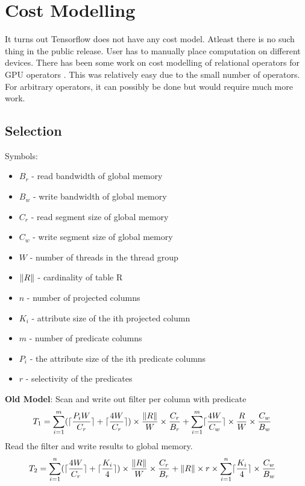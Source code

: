 \section{Cost Modelling}

It turns out Tensorflow does not have any cost model. Atleast there is no such
thing in the public release. User has to manually place computation on different
devices. There has been some work on cost modelling of relational operators for
GPU operators \cite{gpudb}. This was relatively easy due to the small number of
operators. For arbitrary operators, it can possibly be done but would require
much more work.

\subsection{Selection}

Symbols:

\begin{itemize}[label={},noitemsep]
\item $B_r$ - read bandwidth of global memory
\item $B_w$ - write bandwidth of global memory
\item $C_r$ - read segment size of global memory
\item $C_w$ - write segment size of global memory
\item $W$ - number of threads in the thread group
\item $\left\lVert R\right\rVert$ - cardinality of table R
\item $n$ - number of projected columns
\item $K_i$ - attribute size of the ith projected column
\item $m$ - number of predicate columns
\item $P_i$ - the attribute size of the ith predicate columns
\item $r$ - selectivity of the predicates
\end{itemize}

\noindent \textbf{Old Model}: Scan and write out filter per column with predicate
\begin{align*}
T_1 &= \sum_{i=1}^{m} ( \lceil\frac{P_i W}{C_r}\rceil + \lceil\frac{4 W}{C_r}\rceil ) \times \frac{\left\lVert R\right\rVert}{W} \times \frac{C_r}{B_r}  +  \sum_{i=1}^{m} \lceil\frac{4 W}{C_w}\rceil \times \frac{R}{W} \times \frac{C_w}{B_w}
\end{align*}
Read the filter and write results to global memory.
\begin{align*}
T_2 &= \sum_{i=1}^{n} (\lceil\frac{4 W}{C_r}\rceil + \lceil\frac{K_i}{4}\rceil) \times \frac{\left\lVert R\right\rVert}{W} \times \frac{C_r}{B_r} + \left\lVert R\right\rVert \times r \times \sum_{i=1}^{n} \lceil\frac{K_i}{4}\rceil \times \frac{C_w}{B_w}
\end{align*}

